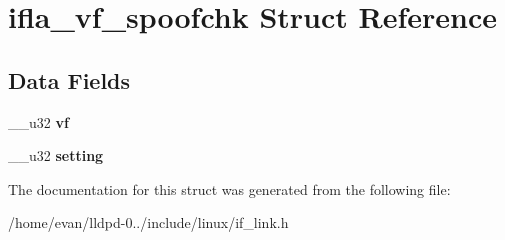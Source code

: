 \section{ifla\-\_\-vf\-\_\-spoofchk \-Struct \-Reference}
\label{structifla__vf__spoofchk}
\subsection*{\-Data \-Fields}
\begin{DoxyCompactItemize}
\item 
\-\_\-\-\_\-u32 {\bfseries vf}\label{structifla__vf__spoofchk_ac91d1ffe1c2fd7c6c010563893822165}

\item 
\-\_\-\-\_\-u32 {\bfseries setting}\label{structifla__vf__spoofchk_acba0bf3fafa323519ba6f8e75603d4d2}

\end{DoxyCompactItemize}


\-The documentation for this struct was generated from the following file\-:\begin{DoxyCompactItemize}
\item 
/home/evan/lldpd-\/0../include/linux/if\-\_\-link.\-h\end{DoxyCompactItemize}
